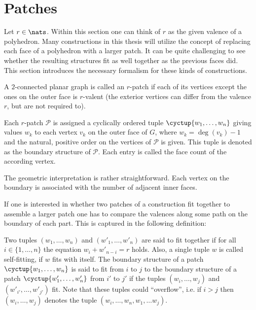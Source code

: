 \section{Patches}

Let $r \in \nats$. Within this section one can think of $r$ as the given valence of a polyhedron. Many constructions in this thesis will utilize the concept of replacing each face of a polyhedron with a larger patch. It can be quite challenging to see whether the resulting structures fit as well together as the previous faces did. This section introduces the necessary formalism for these kinds of constructions.

\begin{definition}[Patch] A $2$-connected planar graph is called an $r$-patch if each of its vertices except the ones on the outer face is $r$-valent (the exterior vertices can differ from the valence $r$, but are not required to).
\end{definition}

\begin{definition} Each $r$-patch $\mathcal{P}$ is assigned a cyclically ordered tuple $\cyctup{w_1, \dots, w_n}$ giving values $w_k$ to each vertex $v_k$ on the outer face of $G$, where $w_k = \deg(v_k) - 1$ and the natural, positive order on the vertices of $\mathcal{P}$ is given. This tuple is denoted as the boundary structure of $\mathcal{P}$. Each entry is called the face count of the according vertex.
\end{definition}

The geometric interpretation is rather straightforward. Each vertex on the boundary is associated with the number of adjacent inner faces.

If one is interested in whether two patches of a construction fit together to assemble a larger patch one has to compare the valences along some path on the boundary of each part. This is captured in the following definition:
\begin{definition}
  Two tuples $(w_1, \dots, w_n)$ and $(w'_1, \dots, w'_n)$ are said to fit together if for all $i \in \{1, \dots, n \}$ the equation $w_i + w'_{n-i} = r$ holds. Also, a single tuple $w$ is called self-fitting, if $w$ fits with itself. The boundary structure of a patch $\cyctup{w_1, \dots, w_n}$ is said to fit from $i$ to $j$ to the boundary structure of a patch $\cyctup{w'_1, \dots, w'_n}$ from $i'$ to $j'$ if the tuples $(w_i, \dots, w_j)$ and $(w'_{i'}, \dots, w'_{j'})$ fit. Note that these tuples could ``overflow'', i.e. if $i > j$ then $(w_i, \dots, w_j)$ denotes the tuple $(w_i, \dots, w_n, w_1, \dots w_j)$.
\end{definition}

